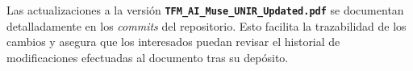 \begin{description}

    Las actualizaciones a la versión \textbf{\texttt{TFM\_AI\_Muse\_UNIR\_Updated.pdf}} se documentan detalladamente en los \emph{commits} del repositorio. Esto facilita la trazabilidad de los cambios y asegura que los interesados puedan revisar el historial de modificaciones efectuadas al documento tras su depósito.



    





\end{description}





